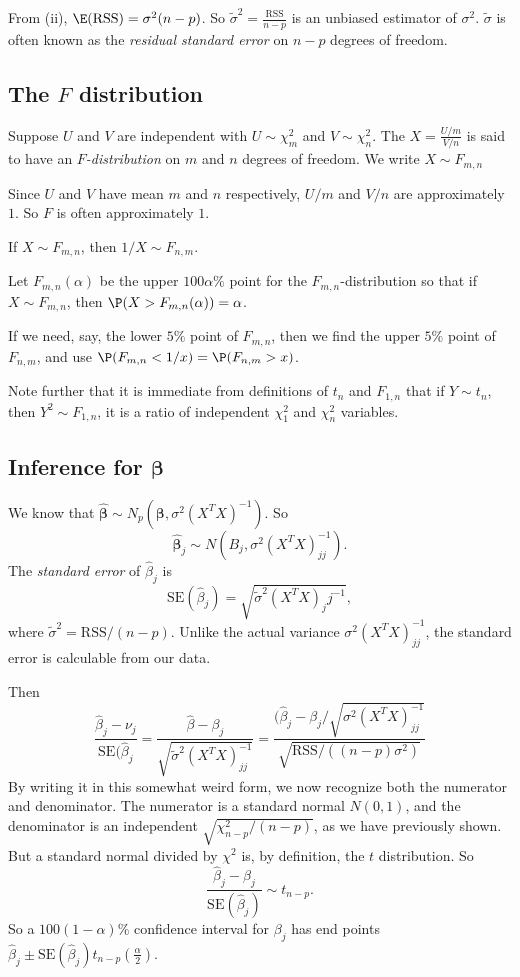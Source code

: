 \documentclass[a4paper]{article}
\begin{document}
From (ii), $\E(\mathrm{RSS}) = \sigma^2(n - p)$. So $\tilde{\sigma}^2 = \frac{\mathrm{RSS}}{n - p}$ is an unbiased estimator of $\sigma^2$. $\tilde{\sigma}$ is often known as the \emph{residual standard error} on $n - p$ degrees of freedom.
\subsection{The \texorpdfstring{$F$}{F} distribution}
\begin{defi}[$F$ distribution]
  Suppose $U$ and $V$ are independent with $U\sim \chi_m^2$ and $V\sim \chi_n^2$. The $X = \frac{U/m}{V/n}$ is said to have an \emph{$F$-distribution} on $m$ and $n$ degrees of freedom. We write $X\sim F_{m, n}$
\end{defi}
Since $U$ and $V$ have mean $m$ and $n$ respectively, $U/m$ and $V/n$ are approximately $1$. So $F$ is often approximately $1$.

\begin{prop}
  If $X\sim F_{m, n}$, then $1/X\sim F_{n, m}$.
\end{prop}

Let $F_{m, n}(\alpha)$ be the upper $100\alpha\%$ point for the $F_{m, n}$-distribution so that if $X\sim F_{m, n}$, then $\P(X > F_{m, n}(\alpha)) = \alpha$.

If we need, say, the lower $5\%$ point of $F_{m, n}$, then we find the upper $5\%$ point of $F_{n, m}$, and use $\P(F_{m, n} < 1/x) = \P(F_{n, m} > x)$.

Note further that it is immediate from definitions of $t_n$ and $F_{1, n}$ that if $Y\sim t_n$, then $Y^2\sim F_{1, n}$, it is a ratio of independent $\chi_1^2$ and $\chi_n^2$ variables.

\subsection{Inference for \texorpdfstring{$\boldsymbol\beta$}{beta}}
We know that $\hat{\boldsymbol\beta} \sim N_p(\boldsymbol\beta, \sigma^2(X^TX)^{-1})$. So
\[
  \hat{\boldsymbol\beta}_j \sim N(B_j, \sigma^2(X^TX)^{-1}_{jj}).
\]
The \emph{standard error} of $\hat{\beta}_j$ is
\[
  \mathrm{SE}(\hat{\beta}_j) = \sqrt{\tilde{\sigma}^2 (X^TX)_jj^{-1}},
\]
where $\tilde{\sigma}^2 = \mathrm{RSS}/(n - p)$. Unlike the actual variance $\sigma^2(X^TX)^{-1}_{jj}$, the standard error is calculable from our data.

Then
\[
  \frac{\hat{\beta}_j - \nu_j}{\mathrm{SE}(\hat{\beta}_j} = \frac{\hat{\beta} - \beta_j}{\sqrt{\tilde{\sigma}^2(X^TX)^{-1}_{jj}}} = \frac{(\hat{\beta}_j - \beta_j/\sqrt{\sigma^2(X^TX)_{jj}^{-1}}}{\sqrt{\mathrm{RSS}/((n - p)\sigma^2)}}
\]
By writing it in this somewhat weird form, we now recognize both the numerator and denominator. The numerator is a standard normal $N(0, 1)$, and the denominator is an independent $\sqrt{\chi^2_{n - p}/(n - p)}$, as we have previously shown. But a standard normal divided by $\chi^2$ is, by definition, the $t$ distribution. So
\[
  \frac{\hat{\beta}_j - \beta_j}{\mathrm{SE}(\hat{\beta}_j)} \sim t_{n - p}.
\]
So a $100(1 - \alpha)\%$ confidence interval for $\beta_j$ has end points $\hat{\beta}_j\pm \mathrm{SE}(\hat{\beta}_j)t_{n - p}(\frac{\alpha}{2})$.
\end{document}
